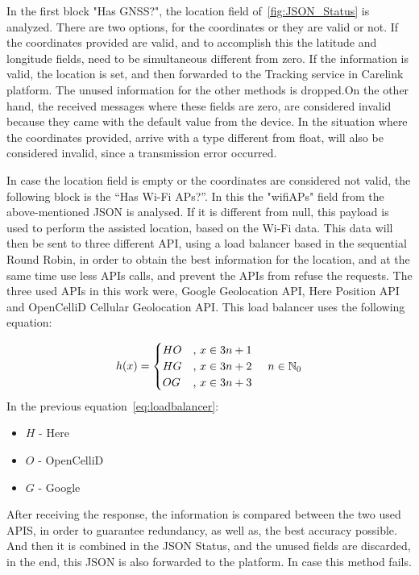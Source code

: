 In the first block "Has GNSS?", the location field of~\ref{fig:JSON_Status} is analyzed. There are two options, for the coordinates or they are valid or not. If the coordinates provided are valid, and to accomplish this the latitude and longitude fields, need to be simultaneous different from zero. If the information is valid, the location is set, and then forwarded to the Tracking service in Carelink platform. The unused information for the other methods is dropped.\newline On the other hand, the received messages where these fields are zero, are considered invalid because they came with the default value from the device. In the situation where the coordinates provided, arrive with a type different from float, will also be considered invalid, since a transmission error occurred.


\newpage

In case the location field is empty or the coordinates are considered not valid, the following block is the “Has Wi-Fi APs?”. In this the "wifiAPs" field from the above-mentioned JSON is analysed. If it is different from null, this payload is used to perform the assisted location, based on the Wi-Fi data. This data will then be sent to three different API,  using a load balancer based in the sequential Round Robin, in order to obtain the best information for the location, and at the same time use less APIs calls, and prevent the APIs from refuse the requests. The three used APIs in this work were, Google Geolocation API, Here Position API and OpenCelliD Cellular Geolocation API. This load balancer uses the following equation:

\begin{equation} \label{eq:loadbalancer}
    h(x) = \begin{cases}
        HO & \text{, }x \in {3n+1}\\
        HG & \text{, }x \in {3n+2}
        \hspace{5mm} n \in \mathbb{N}_{0} \\
        OG & \text{, }x \in {3n+3}
        \end{cases} 
\end{equation}
In the previous equation~\ref{eq:loadbalancer}:
\begin{itemize}
	\item {$H$} - Here 
	\item {$O$} - OpenCelliD
	\item {$G$} - Google

\end{itemize} 
After receiving the response, the information is compared between the two used APIS, in order to guarantee redundancy, as well as, the best accuracy possible. And then it is combined in the JSON Status, and the unused fields are discarded, in the end, this JSON is also forwarded to the platform. In case this method fails.

